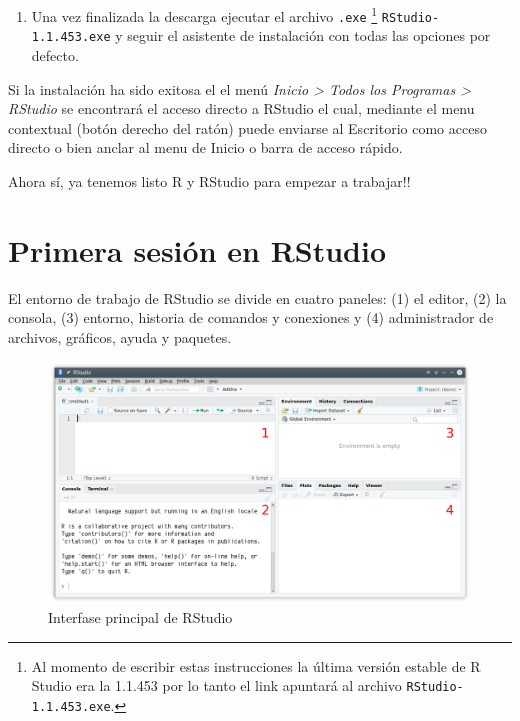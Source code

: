\documentclass[a4paper]{book}
\providecommand{\tightlist}{%
  \setlength{\itemsep}{0pt}\setlength{\parskip}{0pt}}
\let\rmarkdownfootnote\footnote%
\def\footnote{\protect\rmarkdownfootnote}
\begin{document}
\begin{enumerate}
\def\labelenumi{\arabic{enumi})}
\setcounter{enumi}{2}
\tightlist
\item
  Una vez finalizada la descarga ejecutar el archivo \texttt{.exe}
  \footnote{Al momento de escribir estas instrucciones la última versión
    estable de R Studio era la 1.1.453 por lo tanto el link apuntará al
    archivo \texttt{RStudio-1.1.453.exe}.} \texttt{RStudio-1.1.453.exe}
  y seguir el asistente de instalación con todas las opciones por
  defecto.
\end{enumerate}

Si la instalación ha sido exitosa el el menú \emph{Inicio \textgreater{}
Todos los Programas \textgreater{} RStudio} se encontrará el acceso
directo a RStudio el cual, mediante el menu contextual (botón derecho
del ratón) puede enviarse al Escritorio como acceso directo o bien
anclar al menu de Inicio o barra de acceso rápido.

Ahora sí, ya tenemos listo R y RStudio para empezar a trabajar!!

\hypertarget{primera-sesion-en-rstudio}{%
\section{Primera sesión en RStudio}\label{primera-sesion-en-rstudio}}

El entorno de trabajo de RStudio se divide en cuatro paneles: (1) el
editor, (2) la consola, (3) entorno, historia de comandos y conexiones y
(4) administrador de archivos, gráficos, ayuda y paquetes.

\begin{figure}[h]

{\centering \includegraphics[width=0.75\linewidth,]{images/RStudio_paneles} 

}

\caption{Interfase principal de RStudio}\label{fig:unnamed-chunk-10}
\end{figure}
\end{document}
